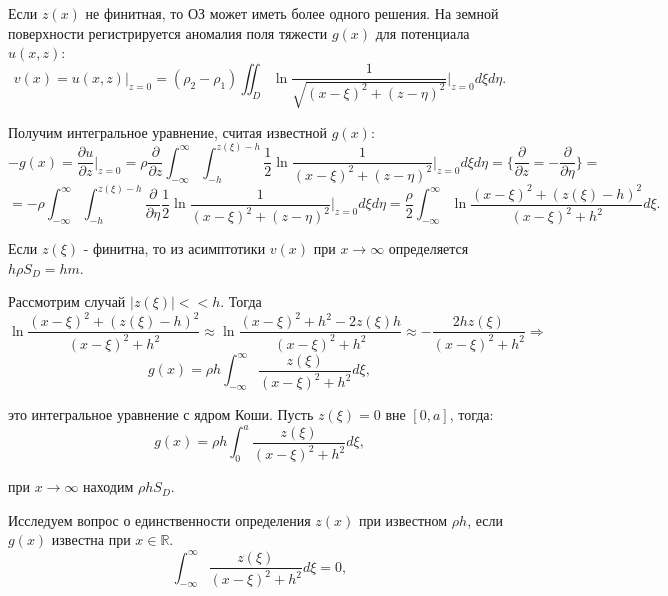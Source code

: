 \documentclass{article}
\begin{document}
Если $z(x)$ не финитная, то ОЗ может иметь более одного решения.
На земной поверхности регистрируется аномалия поля тяжести $g(x)$ для потенциала $u(x,z)$:
\begin{equation*}
	v(x) = u(x,z) \bigg|_{z = 0} = (\rho_2 - \rho_1) \iint_D \ln \dfrac{1}{\sqrt{(x-\xi)^2 + (z - \eta)^2}} \bigg|_{z=0} d\xi d\eta.
\end{equation*}

Получим интегральное уравнение, считая известной $g(x)$:
\begin{equation*}
	-g(x) = \dfrac{\partial u}{\partial z} \bigg|_{z = 0} =
	\rho \dfrac{\partial}{\partial z} \int_{-\infty}^{\infty} \int_{-h}^{z(\xi)-h} \dfrac{1}{2} \ln \dfrac{1}{(x-\xi)^2 +
	(z - \eta)^2} \bigg|_{z=0} d\xi d\eta = \{ \dfrac{\partial}{\partial z} =
 	- \dfrac{\partial}{\partial \eta} \} =
\end{equation*}
\begin{equation*}
	= -\rho \int_{-\infty}^{\infty} \int_{-h}^{z(\xi)-h} \dfrac{\partial}{\partial \eta} \dfrac{1}{2} \ln \dfrac{1}{(x-\xi)^2 +
	(z - \eta)^2} \bigg|_{z=0} d\xi d\eta =
 	\dfrac{\rho}{2} \int_{-\infty}^{\infty} \ln \dfrac{(x-\xi)^2 + (z(\xi) - h)^2}{(x-\xi)^2 + h^2} d\xi.
\end{equation*}

Если $z(\xi)$ - финитна, то из асимптотики $v(x)$ при $x \rightarrow \infty$ определяется $h \rho S_D = hm$.

Рассмотрим случай $|z(\xi)| << h$. Тогда 
\begin{equation*}
	\ln \dfrac{(x-\xi)^2 + (z(\xi) - h)^2}{(x-\xi)^2 + h^2} \approx 
	\ln \dfrac{(x-\xi)^2 + h^2 - 2z(\xi)h}{(x-\xi)^2 + h^2} \approx
	-\dfrac{2hz(\xi)}{(x-\xi)^2 + h^2} \Rightarrow
\end{equation*}
\begin{equation*}
g(x) = \rho h \int_{-\infty}^{\infty} \dfrac{z(\xi)}{(x-\xi)^2 + h^2} d\xi,
\end{equation*}

это интегральное уравнение с ядром Коши. Пусть $z(\xi) = 0$ вне $[0,a]$, тогда:
\begin{equation*}
	g(x) = \rho h \int_{0}^{a} \dfrac{z(\xi)}{(x-\xi)^2 + h^2} d\xi,
\end{equation*}

при $x \rightarrow \infty$ находим $\rho h S_D$.

Исследуем вопрос о единственности определения $z(x)$ при известном $\rho h$, если $g(x)$ известна при $x \in \mathbb{R}$.
\begin{equation*}
	\int_{-\infty}^{\infty} \dfrac{z(\xi)}{(x-\xi)^2 + h^2} d\xi = 0,
\end{equation*}
\end{document}
